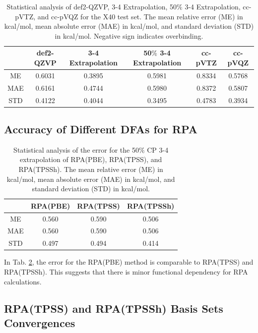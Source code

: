 \documentclass[11pt]{article}
\begin{document}
\begin{table}[hbpt]
  \caption{Statistical analysis of def2-QZVP, 3-4 Extrapolation, 50$\%$ 3-4
    Extrapolation, cc-pVTZ, and cc-pVQZ for the X40 test set. The mean
    relative error (ME) in kcal/mol, mean absolute error (MAE) in kcal/mol,
    and standard deviation (STD) in kcal/mol. Negative sign indicates overbinding.}
  \centering
  \begin{tabular}{c|c|c|c|c|c}
    & def2-QZVP & 3-4 Extrapolation & 50$\%$ 3-4 Extrapolation & cc-pVTZ  &
    cc-pVQZ \\
    \hline\hline
    ME & 0.6031 & 0.3895 & 0.5981 & 0.8334 & 0.5768 \\
    MAE & 0.6161 & 0.4744 & 0.5980 & 0.8372 & 0.5807 \\
    STD & 0.4122 & 0.4044 & 0.3495 & 0.4783 & 0.3934 \\
  \end{tabular}
  \label{tab:table_1}
\end{table}

\subsection{Accuracy of Different DFAs for RPA}

\begin{table}[hbpt]
  \centering
  \caption{Statistical analysis of the error for the 50$\%$ CP 3-4
    extrapolation of RPA(PBE), RPA(TPSS), and RPA(TPSSh). The mean relative
    error (ME) in kcal/mol, mean absolute error (MAE) in kcal/mol, and
    standard deviation (STD) in kcal/mol.}
  \begin{tabular}{c|c|c|c}
    & RPA(PBE) & RPA(TPSS) & RPA(TPSSh) \\
    \hline\hline
    ME & 0.560 & 0.590  & 0.506 \\
    MAE & 0.560 & 0.590 & 0.506 \\
    STD & 0.497 & 0.494 & 0.414 \\
  \end{tabular}
  \label{tab:errors_RPA(DFA)}
\end{table}
In Tab. \ref{tab:errors_RPA(DFA)}, the error for the RPA(PBE) method is
comparable to RPA(TPSS) and RPA(TPSSh). This suggests that there is
minor functional dependency for RPA calculations.

\subsection{RPA(TPSS) and RPA(TPSSh) Basis Sets Convergences}
\end{document}
